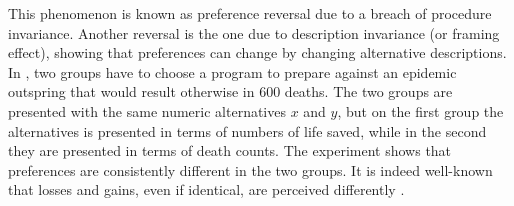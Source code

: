 \documentclass[french, english]{llncs}
\newcommand{\dollars}[1]{\SI{#1}[\$]{}}
\newcommand{\simplebet}[3]{(\dollars{#1}, #2; \dollars{#3})}
\begin{document}
	
	
	This phenomenon is known as preference reversal due to a breach of procedure invariance. Another reversal is the one due to description invariance (or framing effect), showing that preferences can change by changing alternative descriptions. In \citet{tversky_framing_1981}, two groups have to choose a  program to prepare against an epidemic outspring that would result otherwise in 600 deaths. The two groups are presented with the same numeric alternatives $x$ and $y$, but on the first group the alternatives is presented in terms of numbers of life saved, while in the second they are presented in terms of death counts. The experiment shows that preferences are consistently different in the two groups. It is indeed well-known that losses and gains, even if identical, are perceived differently \citet{thaler_toward_1980}.
	
\end{document}
